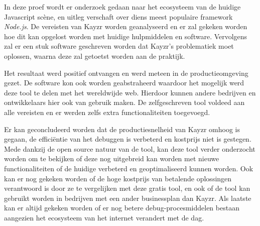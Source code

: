 In deze proef wordt er onderzoek gedaan naar het ecosysteem van de huidige Javascript scène, en uitleg verschaft over diens meest populaire framework \textit{Node.js}. De vereisten van Kayzr worden geanalyseerd en er zal gekeken worden hoe dit kan opgelost worden met huidige hulpmiddelen en software. Vervolgens zal er een stuk software geschreven worden dat Kayzr's problematiek moet oplossen, waarna deze zal getoetst worden aan de praktijk.

 Het resultaat werd positief ontvangen en werd meteen in de productieomgeving gezet. De software kon ook worden geabstraheerd waardoor het mogelijk werd deze tool te delen met het wereldwijde web. Hierdoor kunnen andere bedrijven en ontwikkelaars hier ook van gebruik maken. De zelfgeschreven tool voldeed aan alle vereisten en er werden zelfs extra functionaliteiten toegevoegd.
 
 Er kan geconcludeerd worden dat de productiesnelheid van Kayzr omhoog is gegaan, de efficiëntie van het debuggen is verbeterd en kostprijs niet is gestegen. Mede dankzij de open source natuur van de tool, kan deze tool verder onderzocht worden om te bekijken of deze nog uitgebreid kan worden met nieuwe functionaliteiten of de huidige verbeterd en geoptimaliseerd kunnen worden. Ook kan er nog gekeken worden of de hoge kostprijs van betalende oplossingen verantwoord is door ze te vergelijken met deze gratis tool, en ook of de tool kan gebruikt worden in bedrijven met een ander businessplan dan Kayzr. Als laatste kan er altijd gekeken worden of er nog betere debug-procesmiddelen bestaan aangezien het ecosysteem van het internet verandert met de dag. 

